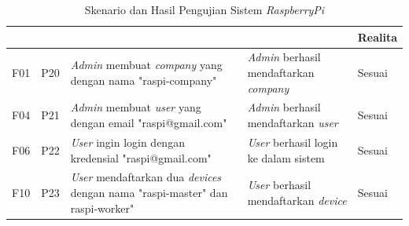 \bgroup
\begin{table}[ht]
  \def\arraystretch{1.3}
  \caption{Skenario dan Hasil Pengujian Sistem \textit{RaspberryPi}}
  \label{tab:pengujian-sistem-raspi}
  \centering
  \begin{tabular}{|p{2cm}|p{2cm}|p{4cm}|p{3cm}|p{2cm}|}
    \hline
    \centering{ID Fungsional} & \centering{ID Pengujian}                            & \centering{Skenario}                                                                                                                                                                                                                  & \centering{Ekspektasi}                                                 & Realita \\
    \hline
    F01                       & P20                                                 & \textit{Admin} membuat \textit{company} yang dengan nama "raspi-company"                                                                                                                                                              & \textit{Admin} berhasil mendaftarkan \textit{company}                  & Sesuai  \\
    \hline
    F04                       & P21                                                 & \textit{Admin} membuat \textit{user} yang dengan email "raspi@gmail.com"                                                                                                                                                              & \textit{Admin} berhasil mendaftarkan \textit{user}                     & Sesuai  \\
    \hline
    F06                       & P22                                                 & \textit{User} ingin login dengan kredensial "raspi@gmail.com"                                                                                                                                                                         & \textit{User} berhasil login ke dalam sistem                           & Sesuai  \\
    \hline
    F10                       & P23                                                 & \textit{User} mendaftarkan dua \textit{devices} dengan nama "raspi-master" dan
    raspi-worker"             & \textit{User} berhasil mendaftarkan \textit{device} & Sesuai                                                                                                                                                                                                                                                                                                                   \\

\end{tabular}
\end{table}
